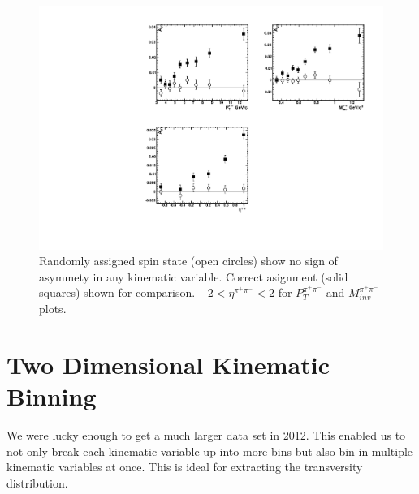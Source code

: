 \documentclass[abstract = on,listof=totoc, bibliography=totoc]{scrreprt}
\newcommand{\ptpair}{P_{T}^{\pi^+\pi^-}}
\newcommand{\mpair}{M_{inv}^{\pi^+\pi^-}}
\newcommand{\etapair}{\eta^{\pi^+\pi^-}}
\newcommand{\pip}{\pi^+}
\newcommand{\pim}{\pi^-}
\newcommand{\pair}{$\pip\pim$ }
\begin{document}
\begin{figure}
\begin{center}
\includegraphics[width = 1\textwidth]{randomCharge}
\caption[Asymmetry in \pair pairs when proton spin is randomly assigned]{Randomly assigned spin state (open circles) show no sign of asymmety in any kinematic variable. Correct asignment (solid squares) shown for comparison. $-2<\etapair<2$ for $\ptpair$ and $\mpair$ plots.}
\label{fig:randomCharge}
\end{center}
\end{figure}




\section{Two Dimensional Kinematic Binning}

We were lucky enough to get a much larger data set in 2012. This enabled us to not only break each kinematic variable up into more bins but also bin in multiple kinematic variables at once. This is ideal for extracting the transversity distribution. 


\end{document}
